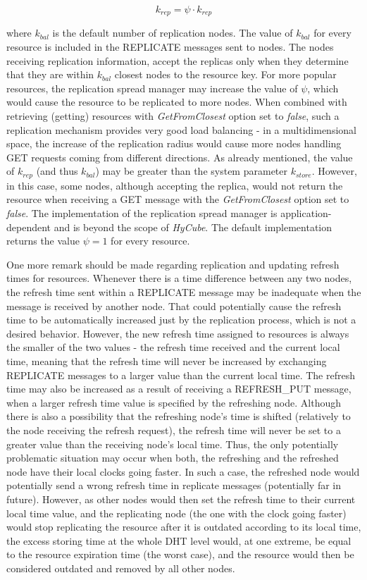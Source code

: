 \begin{equation}
k_{rep} = \psi \cdot k_{rep}
\end{equation}

\noindent
where $k_{bal}$ is the default number of replication nodes. The value of $k_{bal}$ for every resource is included in the REPLICATE messages sent to nodes. The nodes receiving replication information, accept the replicas only when they determine that they are within $k_{bal}$ closest nodes to the resource key. For more popular resources, the replication spread manager may increase the value of $\psi$, which would cause the resource to be replicated to more nodes. When combined with retrieving (getting) resources with \emph{GetFromClosest} option set to \emph{false}, such a replication mechanism provides very good load balancing - in a multidimensional space, the increase of the replication radius would cause more nodes handling GET requests coming from different directions. As already mentioned, the value of $k_{rep}$ (and thus $k_{bal}$) may be greater than the system parameter $k_{store}$. However, in this case, some nodes, although accepting the replica, would not return the resource when receiving a GET message with the \emph{GetFromClosest} option set to \emph{false}. The implementation of the replication spread manager is application-dependent and is beyond the scope of \emph{HyCube}. The default implementation returns the value $\psi = 1$ for every resource.

One more remark should be made regarding replication and updating refresh times for resources. Whenever there is a time difference between any two nodes, the refresh time sent within a REPLICATE message may be inadequate when the message is received by another node. That could potentially cause the refresh time to be automatically increased just by the replication process, which is not a desired behavior. However, the new refresh time assigned to resources is always the smaller of the two values - the refresh time received and the current local time, meaning that the refresh time will never be increased by exchanging REPLICATE messages to a larger value than the current local time. The refresh time may also be increased as a result of receiving a REFRESH\_PUT message, when a larger refresh time value is specified by the refreshing node. Although there is also a possibility that the refreshing node's time is shifted (relatively to the node receiving the refresh request), the refresh time will never be set to a greater value than the receiving node's local time. Thus, the only potentially problematic situation may occur when both, the refreshing and the refreshed node have their local clocks going faster. In such a case, the refreshed node would potentially send a wrong refresh time in replicate messages (potentially far in future). However, as other nodes would then set the refresh time to their current local time value, and the replicating node (the one with the clock going faster) would stop replicating the resource after it is outdated according to its local time, the excess storing time at the whole DHT level would, at one extreme, be equal to the resource expiration time (the worst case), and the resource would then be considered outdated and removed by all other nodes.

